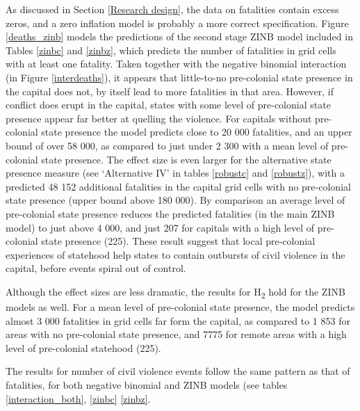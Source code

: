 As discussed in Section \ref{Research design}, the data on fatalities contain
excess zeros, and a zero inflation model is probably a more correct
specification. Figure \ref{deaths_zinb} models the predictions of the second
stage ZINB model included in Tables \ref{zinbc} and \ref{zinbz}, which predicts
the number of fatalities in grid cells with at least one fatality. Taken
together with the negative binomial interaction (in Figure \ref{interdeaths}),
it appears that little-to-no pre-colonial state presence in the capital does
not, by itself lead to more fatalities in that area. However, if conflict does
erupt in the capital, states with some level of pre-colonial state presence
appear far better at quelling the violence. For capitals without pre-colonial
state presence the model predicts close to 20 000 fatalities, and an upper bound
of over 58 000, as compared to just under 2 300 with a mean level of
pre-colonial state presence. The effect size is even larger for the alternative
state presence measure (see `Alternative IV' in tables \ref{robustc} and
\ref{robustz}), with a predicted 48 152 additional fatalities in the capital
grid cells with no pre-colonial state presence (upper bound above 180 000). By
comparison an average level of pre-colonial state presence reduces the predicted
fatalities (in the main ZINB model) to just above 4 000, and just 207 for
capitals with a high level of pre-colonial state presence (225). These result
suggest that local pre-colonial experiences of statehood help states to contain
outbursts of civil violence in the capital, before events spiral out of control.

Although the effect sizes are less dramatic, the results for H\textsubscript{2}
hold for the ZINB models as well. For a mean level of pre-colonial state
presence, the model predicts almost 3 000 fatalities in grid cells far form the
capital, as compared to 1 853 for areas with no pre-colonial state presence, and
7775 for remote areas with a high level of pre-colonial statehood (225).

The results for number of civil violence events follow the same pattern as that
of fatalities, for both negative binomial and ZINB models (see tables
\ref{interaction_both}, \ref{zinbc} \ref{zinbz}.


